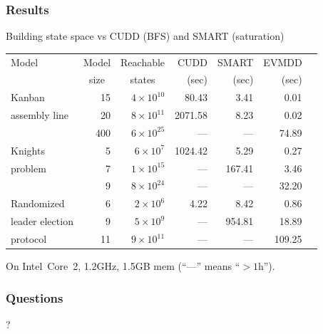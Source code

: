 \documentclass{beamer}
\begin{document}
\begin{frame}
  \frametitle{Results}

  Building state space vs CUDD (BFS) and SMART (saturation)
  \begin{center}
    \begin{tabular}{|l|r||r||r|r|r|r|}
      \hline
      {\footnotesize Model} & \multicolumn{1}{|c||}{\footnotesize Model} & \multicolumn{1}{c||}{\footnotesize Reachable} & {\footnotesize CUDD} & {\footnotesize SMART} & {\footnotesize EVMDD} \\
      & \multicolumn{1}{|c||}{\footnotesize size}  & \multicolumn{1}{c||}{\footnotesize states}  & {\footnotesize (sec)} & {\footnotesize (sec)} & {\footnotesize (sec)} \\
      \hline
      \hline
      {\footnotesize Kanban} & 15 & $4\times10^{10}$ &   80.43 &    3.41 &    0.01 \\
      {\footnotesize assembly line} & 20 & $8\times10^{11}$ & 2071.58 &    8.23 &    0.02 \\
      & 400 & $6\times10^{25}$ &   --- &   --- &   74.89 \\
      \hline
      \hline
      {\footnotesize Knights} & 5 & $6\times10^{7}$ & 1024.42 &    5.29 &    0.27 \\
      {\footnotesize problem} & 7 & $1\times10^{15}$ &   --- &  167.41 &    3.46 \\
      & 9 & $8\times10^{24}$ &   --- &   --- &   32.20 \\
      \hline
      \hline
      {\footnotesize Randomized} & 6 & $2\times10^{6}$ &   4.22 &    8.42 &    0.86 \\
      {\footnotesize leader election} & 9 & $5\times10^{9}$ &   --- &  954.81 &   18.89 \\
      {\footnotesize protocol} & 11 & $9\times10^{11}$ &   --- &   --- &  109.25 \\
      \hline
    \end{tabular}
    On Intel~Core~2, 1.2GHz, 1.5GB mem (``---'' means ``$>1$h'').
  \end{center}
\end{frame}

\appendix



\begin{frame}
  \frametitle{Questions}

  \begin{center}
    {\Huge ?}
  \end{center}
\end{frame}
\end{document}
